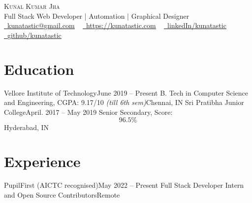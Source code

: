 \documentclass[letterpaper,11pt]{article}
\begin{document}
\begin{center}
    {\Huge \scshape Kunal Kumar Jha} \\ \vspace{1pt}
    Full Stack Web Developer | Automation | Graphical Designer   \\ \vspace{1pt}
    \href{mailto:kunatastic@gmail.com}{\raisebox{-0.2\height}\faEnvelope\  \underline{kunatastic@gmail.com}} ~ 
    \href{https://kunatastic.com}{\raisebox{-0.2\height}\faLink\ \underline{https://kunatastic.com}} ~ 
    \href{https://linkedin.com/in/kunatastic/}{\raisebox{-0.2\height}\faLinkedin\ \underline{linkedIn/kunatastic}}  ~
    \href{https://github.com/kunatastic}{\raisebox{-0.2\height}\faGithub\ \underline{github/kunatastic}}
    \vspace{-8pt}
\end{center}

\vspace{-20pt}
\section{Education}
  \resumeSubHeadingListStart
    \resumeSubheading
      {Vellore Institute of Technology}{June 2019 -- Present}
      {B. Tech in Computer Science and Engineering, CGPA: 9.17/10 \emph{(till 6th sem)}}{Chennai, IN}
  \vspace{-4pt}
    \resumeSubheading
      {Sri Pratibha Junior College}{April. 2017 -- May 2019}
      {Senior Secondary, Score: $$96.5\%$$}{Hyderabad, IN}
  \resumeSubHeadingListEnd

\vspace{-20pt}
\section{Experience}
  \resumeSubHeadingListStart

    \resumeSubheading
      {PupilFirst (AICTC recognised)}{May 2022 -- Present}
      {Full Stack Developer Intern and Open Source Contributors}{Remote}
      \resumeItemListStart
      \resumeItemListEnd
\end{document}
